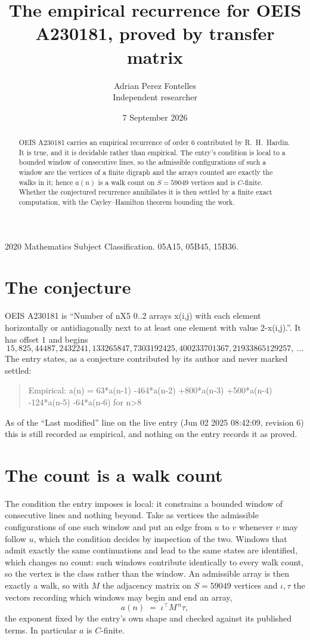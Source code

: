 \documentclass[11pt,a4paper]{article}
\title{The empirical recurrence for OEIS A230181, proved by transfer matrix}
\author{Adrian Perez Fontelles\\ \small Independent researcher}
\date{7 September 2026}
\theoremstyle{plain}
\theoremstyle{definition}
\begin{document}
\maketitle

\begin{abstract}
OEIS A230181 carries an empirical recurrence of order $6$ contributed by R.~H.~Hardin. It is
true, and it is decidable rather than empirical. The entry's condition is local to a bounded window of consecutive lines, so
the admissible configurations of such a window are the vertices of a finite digraph and the
arrays counted are exactly the walks in it; hence $a(n)$ is a walk count on $S=59049$ vertices
and is $C$-finite. Whether the conjectured recurrence annihilates it is then settled by a
finite exact computation, with the Cayley--Hamilton theorem bounding the work.
\end{abstract}

\noindent\small 2020 Mathematics Subject Classification. 05A15, 05B45, 15B36.\normalsize

\section{The conjecture}

OEIS A230181 is ``Number of nX5 0..2 arrays x(i,j) with each element horizontally or antidiagonally next to at least one element with value 2-x(i,j).''. It has offset $1$ and begins
\[
15, 825, 44487, 2432241, 133265847, 7303192425, 400233701367, 21933865129257,\ \dots
\]
The entry states, as a conjecture contributed by its author and never marked settled:
\begin{quote}
Empirical: a(n) = 63*a(n-1) -464*a(n-2) +800*a(n-3) +500*a(n-4) -124*a(n-5) -64*a(n-6) for n>8
\end{quote}
As of the ``Last modified'' line on the live entry (Jun 02 2025 08:42:09, revision 6) this is still
recorded as empirical, and nothing on the entry records it as proved.

\section{The count is a walk count}

The condition the entry imposes is local: it constrains a bounded window of consecutive lines and nothing beyond. Take as
vertices the admissible configurations of one such window and put an edge from $u$ to $v$
whenever $v$ may follow $u$, which the condition decides by inspection of the two. Windows that admit exactly the same continuations and lead to the same states are identified, which changes no count: such windows contribute identically to every walk count, so the vertex is the class rather than the window. An
admissible array is then exactly a walk, so with $M$ the adjacency matrix on $S=59049$ vertices
and $\iota,\tau$ the vectors recording which windows may begin and end an array,
\[
a(n)\;=\;\iota^{\!\top}M^{\,n}\tau ,
\]
the exponent fixed by the entry's own shape and checked against its published terms. In
particular $a$ is $C$-finite.
\end{document}
